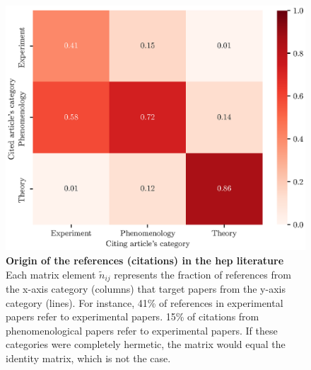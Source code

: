 \documentclass[smallextended]{svjour3}
\begin{document}
\begin{figure}
    \centering
    \includegraphics{Fig10.eps}
    \caption{\textbf{Origin of the references (citations) in the \gls{hep} literature}
    Each matrix element $\tilde{n}_{ij}$ represents the fraction of references from the x-axis category (columns) that target papers from the y-axis category (lines). For instance, 41\% of references in experimental papers refer to experimental papers. 15\% of citations from phenomenological papers refer to experimental papers. If these categories were completely hermetic, the matrix would equal the identity matrix, which is not the case.}
    \label{fig:cites_matrix}
\end{figure}

\end{document}
